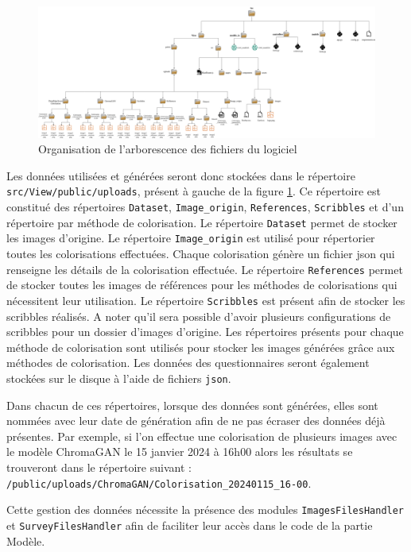 \documentclass{article}
\begin{document}
\begin{figure}[htp]
    \centering
    \includegraphics[width=17cm]{code-architecture-files.png}
    \caption{Organisation de l'arborescence des fichiers du logiciel}
    \label{fig:architecturefiles}
\end{figure}

Les données utilisées et générées seront donc stockées dans le répertoire \texttt{src/View/public/uploads}, présent à gauche de la figure \ref{fig:architecturefiles}. 
Ce répertoire est constitué des répertoires \texttt{Dataset}, \texttt{Image\_origin}, \texttt{References}, \texttt{Scribbles} et d'un répertoire par méthode de colorisation. 
Le répertoire \texttt{Dataset} permet de stocker les images d'origine.
Le répertoire \texttt{Image\_origin} est utilisé pour répertorier toutes les colorisations effectuées.
Chaque colorisation génère un fichier json qui renseigne les détails de la colorisation effectuée.
Le répertoire \texttt{References} permet de stocker toutes les images de références pour les méthodes de colorisations qui nécessitent leur utilisation.
Le répertoire \texttt{Scribbles} est présent afin de stocker les scribbles réalisés. 
A noter qu'il sera possible d'avoir plusieurs configurations de scribbles pour un dossier d'images d'origine.
Les répertoires présents pour chaque méthode de colorisation sont utilisés pour stocker les images générées grâce aux méthodes de colorisation.
Les données des questionnaires seront également stockées sur le disque à l'aide de fichiers \texttt{json}.

Dans chacun de ces répertoires, lorsque des données sont générées, elles sont nommées avec leur date de génération afin de ne pas écraser des données déjà présentes. 
Par exemple, si l'on effectue une colorisation de plusieurs images avec le modèle ChromaGAN le 15 janvier 2024 à 16h00 alors les résultats se trouveront dans le répertoire suivant : \texttt{/public/uploads/ChromaGAN/Colorisation\_20240115\_16-00}.

Cette gestion des données nécessite la présence des modules \texttt{ImagesFilesHandler} et \texttt{SurveyFilesHandler} afin de faciliter leur accès dans le code de la partie Modèle. \\
\end{document}
